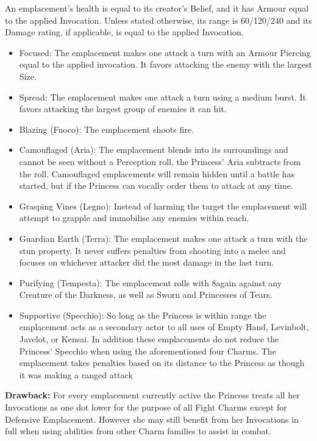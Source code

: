 An emplacement's health is equal to its creator's Belief, and it has Armour equal to the applied Invocation. Unless stated otherwise, its range is 60/120/240 and its Damage rating, if applicable, is equal to the applied Invocation. 

 \begin{itemize}
 \item Focused: The emplacement makes one attack a turn with an Armour Piercing equal to the applied invocation. It favors attacking the enemy with the largest Size. 
 \item Spread: The emplacement makes one attack a turn using a medium burst. It favors attacking the largest group of enemies it can hit. 
 \item Blazing (Fuoco): The emplacement shoots fire.
 \item Camouflaged (Aria): The emplacement blends into its surroundings and cannot be seen without a Perception roll, the Princess' Aria subtracts from the roll. Camouflaged emplacements will remain hidden until a battle has started, but if the Princess can vocally order them to attack at any time. 
 \item Grasping Vines (Legno): Instead of harming the target the emplacement will attempt to grapple and immobilise any enemies within reach. 
 \item Guardian Earth (Terra): The emplacement makes one attack a turn with the stun property. It never suffers penalties from shooting into a melee and focuses on whichever attacker did the most damage in the last turn. 
 \item Purifying (Tempesta): The emplacement rolls with 8again against any Creature of the Darkness, as well as Sworn and Princesses of Tears.
 \item Supportive (Specchio): So long as the Princess is within range the emplacement acts as a secondary actor to all uses of Empty Hand, Levinbolt, Javelot, or Kensai. In addition these emplacements do not reduce the Princess' Specchio when using the aforementioned four Charms. The emplacement takes penalties based on its distance to the Princess as though it was making a ranged attack
 \end{itemize}
 
 \textbf{Drawback:} For every emplacement currently active the Princess treats all her Invocations as one dot lower for the purpose of all Fight Charms except for Defensive Emplacement. However she may still benefit from her Invocations in full when using abilities from other Charm families to assist in combat. 
 

